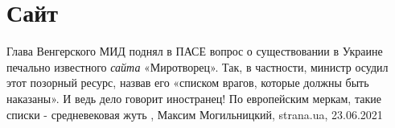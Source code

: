  
 
 
 
 
\chapter{Сайт}

Глава Венгерского МИД поднял в ПАСЕ вопрос о существовании в Украине печально
известного \emph{сайта} «Миротворец». Так, в частности, министр осудил этот
позорный ресурс, назвав его «списком врагов, которые должны быть наказаны». И
ведь дело говорит иностранец! По европейским меркам, такие списки -
средневековая жуть
, 
Максим Могильницкий, strana.ua, 23.06.2021

